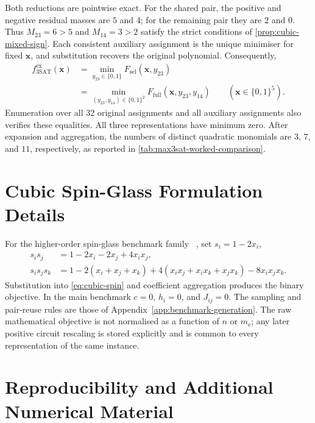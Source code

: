 \documentclass[a4paper,onecolumn,11pt,unpublished]{quantumarticle}
\newcommand{\bits}{\{0,1\}}
\theoremstyle{remark}
\begin{document}
Both reductions are pointwise exact. For the shared pair, the positive and
negative residual masses are $5$ and $4$; for the remaining pair they are $2$
and $0$. Thus $M_{23}=6>5$ and $M_{14}=3>2$ satisfy the strict conditions of
\cref{prop:cubic-mixed-sign}. Each consistent auxiliary assignment is the
unique minimiser for fixed $\bm x$, and substitution recovers the original
polynomial. Consequently,
\begin{equation}
\begin{split}
 f_{\mathrm{3SAT}}^{\mathrm{ex}}(\bm x)
 &=\min_{y_{23}\in\bits}F_{\mathrm{sel}}(\bm x,y_{23})\\
 &=\min_{(y_{23},y_{14})\in\bits^2}F_{\mathrm{full}}(\bm x,y_{23},y_{14})
 \qquad (\bm x\in\bits^5).
\end{split}
\label{eq:max3sat-worked-verification}
\end{equation}
Enumeration over all 32 original assignments and all auxiliary assignments
also verifies these equalities. All three representations have minimum zero.
After expansion and aggregation, the numbers of distinct quadratic monomials
are $3$, $7$, and $11$, respectively, as reported in
\cref{tab:max3sat-worked-comparison}.

\section{Cubic Spin-Glass Formulation Details}
\label{app:spin-glass}

For the higher-order spin-glass benchmark family
~\cite{Basso2022,PelofskeShortDepth2024,Pelofske2024}, set $s_i=1-2x_i$,
\begin{align}
    s_is_j&=1-2x_i-2x_j+4x_ix_j,\\
    s_is_js_k&=1-2(x_i+x_j+x_k)
      +4(x_ix_j+x_ix_k+x_jx_k)-8x_ix_jx_k.
\end{align}
Substitution into \cref{eq:cubic-spin} and coefficient aggregation produces the
binary objective.  In the main benchmark $c=0$, $h_i=0$, and $J_{ij}=0$.
The sampling and pair-reuse rules are those of
Appendix~\ref{app:benchmark-generation}.  The raw mathematical
objective is not normalised as a function of $n$ or $m_{\mathrm e}$; any later
positive circuit rescaling is stored explicitly and is common to every
representation of the same instance.

\section{Reproducibility and Additional Numerical Material}
\label{app:reproducibility}
\end{document}
